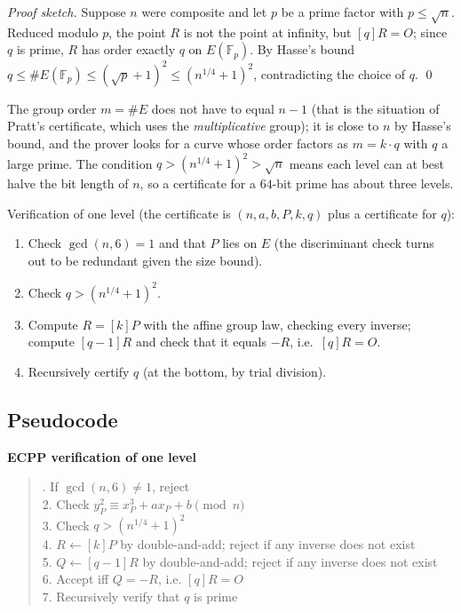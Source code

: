 \documentclass[12pt]{article}
\begin{document}
\emph{Proof sketch.} Suppose \( n \) were composite and let \( p \) be a prime factor with \( p \le \sqrt{n} \). Reduced modulo \( p \), the point \( R \) is not the point at infinity, but \( [q]R = O \); since \( q \) is prime, \( R \) has order exactly \( q \) on \( E(\mathbb{F}_p) \). By Hasse's bound \( q \le \#E(\mathbb{F}_p) \le (\sqrt{p}+1)^2 \le (n^{1/4}+1)^2 \), contradicting the choice of \( q \). \qed

The group order \( m = \#E \) does not have to equal \( n-1 \) (that is the situation of Pratt's certificate, which uses the \emph{multiplicative} group); it is close to \( n \) by Hasse's bound, and the prover looks for a curve whose order factors as \( m = k \cdot q \) with \( q \) a large prime. The condition \( q > (n^{1/4}+1)^2 > \sqrt{n} \) means each level can at best halve the bit length of \( n \), so a certificate for a \( 64 \)-bit prime has about three levels.

Verification of one level (the certificate is \( (n, a, b, P, k, q) \) plus a certificate for \( q \)):
\begin{enumerate}
    \item Check \( \gcd(n,6)=1 \) and that \( P \) lies on \( E \) (the discriminant check turns out to be redundant given the size bound).
    \item Check \( q > (n^{1/4}+1)^2 \).
    \item Compute \( R = [k]P \) with the affine group law, checking every inverse; compute \( [q-1]R \) and check that it equals \( -R \), i.e.\ \( [q]R = O \).
    \item Recursively certify \( q \) (at the bottom, by trial division).
\end{enumerate}

\subsection*{Pseudocode}

\textbf{ECPP verification of one level}

\begin{quote}. If \( \gcd(n,6) \neq 1 \), reject \\
2. Check \( y_P^2 \equiv x_P^3 + a x_P + b \pmod{n} \) \\
3. Check \( q > (n^{1/4}+1)^2 \) \\
4. \( R \leftarrow [k]P \) by double-and-add; reject if any inverse does not exist \\
5. \( Q \leftarrow [q-1]R \) by double-and-add; reject if any inverse does not exist \\
6. Accept iff \( Q = -R \), i.e. \( [q]R = O \) \\
7. Recursively verify that \( q \) is prime
\end{quote}
\end{document}
